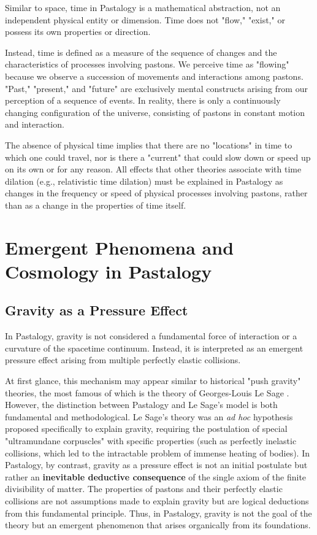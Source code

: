 \documentclass[pdflatex,sn-mathphys-num,referee]{sn-jnl}
\begin{document}
Similar to space, time in Pastalogy is a mathematical abstraction, not an independent physical entity or dimension. Time does not "flow," "exist," or possess its own properties or direction.

Instead, time is defined as a measure of the sequence of changes and the characteristics of processes involving pastons. We perceive time as "flowing" because we observe a succession of movements and interactions among pastons. "Past," "present," and "future" are exclusively mental constructs arising from our perception of a sequence of events. In reality, there is only a continuously changing configuration of the universe, consisting of pastons in constant motion and interaction.

The absence of physical time implies that there are no "locations" in time to which one could travel, nor is there a "current" that could slow down or speed up on its own or for any reason. All effects that other theories associate with time dilation (e.g., relativistic time dilation) must be explained in Pastalogy as changes in the frequency or speed of physical processes involving pastons, rather than as a change in the properties of time itself.

\section{Emergent Phenomena and Cosmology in Pastalogy}\label{sec:emergent-cosmology}

\subsection{Gravity as a Pressure Effect}\label{subsec:gravity-pressure}

In Pastalogy, gravity is not considered a fundamental force of interaction or a curvature of the spacetime continuum. Instead, it is interpreted as an emergent pressure effect arising from multiple perfectly elastic collisions.

At first glance, this mechanism may appear similar to historical "push gravity" theories, the most famous of which is the theory of Georges-Louis Le Sage \cite{lesage-edwards2014}. However, the distinction between Pastalogy and Le Sage's model is both fundamental and methodological. Le Sage's theory was an \textit{ad hoc} hypothesis proposed specifically to explain gravity, requiring the postulation of special "ultramundane corpuscles" with specific properties (such as perfectly inelastic collisions, which led to the intractable problem of immense heating of bodies). In Pastalogy, by contrast, gravity as a pressure effect is not an initial postulate but rather an \textbf{inevitable deductive consequence} of the single axiom of the finite divisibility of matter. The properties of pastons and their perfectly elastic collisions are not assumptions made to explain gravity but are logical deductions from this fundamental principle. Thus, in Pastalogy, gravity is not the goal of the theory but an emergent phenomenon that arises organically from its foundations.
\end{document}

